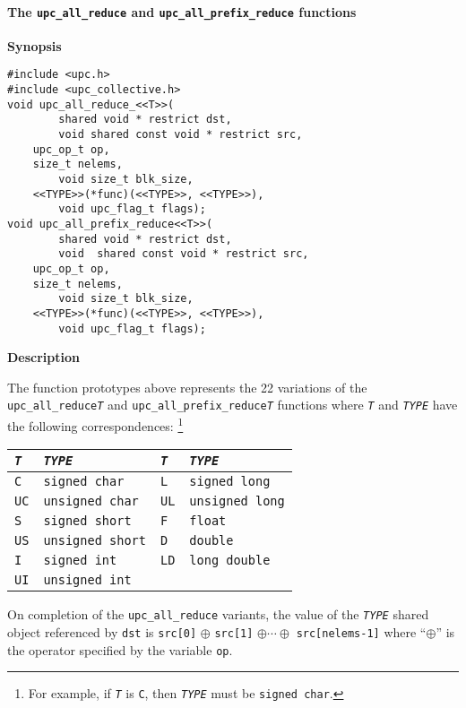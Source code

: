 \paragraph{The {\tt upc\_all\_reduce} and {\tt upc\_all\_prefix\_reduce} functions}
\label{reduction}

{\bf Synopsis} 

\npf 
\begin{verbatim}
#include <upc.h>
#include <upc_collective.h>
void upc_all_reduce_<<T>>(
        shared void * restrict dst,
        void shared const void * restrict src,
	upc_op_t op,
	size_t nelems,
        void size_t blk_size,
	<<TYPE>>(*func)(<<TYPE>>, <<TYPE>>),
        void upc_flag_t flags);
void upc_all_prefix_reduce<<T>>(
        shared void * restrict dst,
        void  shared const void * restrict src,
	upc_op_t op,
	size_t nelems,
        void size_t blk_size,
	<<TYPE>>(*func)(<<TYPE>>, <<TYPE>>),
        void upc_flag_t flags);
\end{verbatim}
        
{\bf Description} 

\np The function prototypes above represents the 22 variations of the
  {\tt upc\_all\_reduce{\em T}} and {\tt upc\_all\_prefix\_reduce{\em T}} 
  functions where {\tt {\em T}} and {\tt {\em TYPE}} have the following 
correspondences: \footnote{For example, if {\tt {\em T}} is {\tt C}, then 
{\tt {\em TYPE}} must be {\tt signed char}.}
\begin{center}
\begin{tabular}{ll|ll}
{\tt {\em T}} & {\tt {\em TYPE}} \hspace*{1.5in} &
{\tt {\em T}} & {\tt {\em TYPE}} \\ \hline
{\tt C} & {\tt signed char} &
{\tt L} & {\tt signed long} \\
{\tt UC} & {\tt unsigned char} &
{\tt UL} & {\tt unsigned long} \\
{\tt S} & {\tt signed short} &
{\tt F} & {\tt float} \\
{\tt US} & {\tt unsigned short} &
{\tt D} & {\tt double} \\
{\tt I} & {\tt signed int} &
{\tt LD} & {\tt long double} \\
{\tt UI} & {\tt unsigned int} &
\end{tabular}
\end{center}

\np On completion of the {\tt upc\_all\_reduce} variants, 
the value of the {\tt {\em TYPE}} shared object
referenced by {\tt dst} is
{\tt src[0]} $\oplus$ {\tt src[1]} $\oplus \cdots \oplus$
{\tt src[nelems-1]}
where ``$\oplus$'' is the operator specified by the variable {\tt op}.

